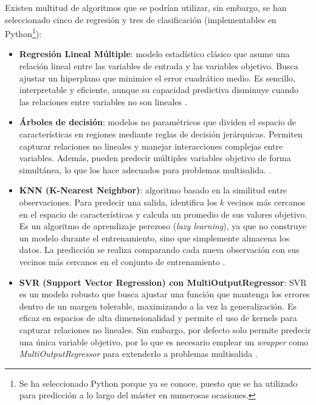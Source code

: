 Existen multitud de algoritmos que se podrían utilizar, sin embargo, se han seleccionado cinco de regresión y tres de clasificación (implementables en Python\footnote{Se ha seleccionado Python porque ya se conoce, puesto que se ha utilizado para predicción a lo largo del máster en numerosas ocasiones.}):
\begin{itemize}
    \item \textbf{Regresión Lineal Múltiple}: modelo estadístico clásico que asume una relación lineal entre las variables de entrada y las variables objetivo. Busca ajustar un hiperplano que minimice el error cuadrático medio. Es sencillo, interpretable y eficiente, aunque su capacidad predictiva disminuye cuando las relaciones entre variables no son lineales \cite{sklearn_linear_regression}.

    \item \textbf{Árboles de decisión}: modelos no paramétricos que dividen el espacio de características en regiones mediante reglas de decisión jerárquicas. Permiten capturar relaciones no lineales y manejar interacciones complejas entre variables. Además, pueden predecir múltiples variables objetivo de forma simultánea, lo que los hace adecuados para problemas multisalida. \cite{sklearn_DecisionTrees}.

    \item \textbf{KNN (K-Nearest Neighbor)}: algoritmo basado en la similitud entre observaciones. Para predecir una salida, identifica los $k$ vecinos más cercanos en el espacio de características y calcula un promedio de sus valores objetivo. Es un algoritmo de aprendizaje perezoso (\textit{lazy learning}), ya que no construye un modelo durante el entrenamiento, sino que simplemente almacena los datos. La predicción se realiza comparando cada nueva observación con sus vecinos más cercanos en el conjunto de entrenamiento \cite{sklearn_knn,sklearn_knn_regressor}.

    \item \textbf{SVR (Support Vector Regression) con MultiOutputRegressor}: SVR es un modelo robusto que busca ajustar una función que mantenga los errores dentro de un margen tolerable, maximizando a la vez la generalización. Es eficaz en espacios de alta dimensionalidad y permite el uso de kernels para capturar relaciones no lineales. Sin embargo, por defecto solo permite predecir una única variable objetivo, por lo que es necesario emplear un \textit{wrapper} como \textit{MultiOutputRegressor} para extenderlo a problemas multisalida \cite{sklearn_svr, sklearn_MultiOutputRegressor}.


\end{itemize}
